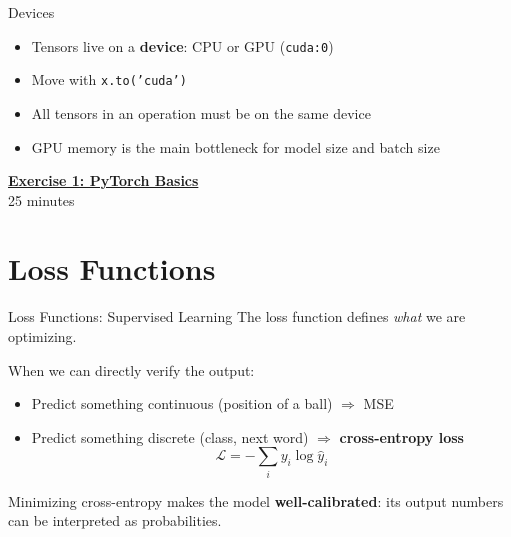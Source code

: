 \documentclass[aspectratio=169]{beamer}
\begin{document}
\begin{frame}[fragile]{Devices}
\begin{itemize}
\item Tensors live on a \textbf{device}: CPU or GPU (\texttt{cuda:0})
\item Move with \texttt{x.to('cuda')}
\item All tensors in an operation must be on the same device
\item GPU memory is the main bottleneck for model size and batch size
\end{itemize}
\end{frame}

\begin{frame}{}
\centering
\Large \href{https://colab.research.google.com/github/wusche1/Illiad_ML_Engineering/blob/main/lectures/01_a_ml_foundations/exercises/01_pytorch_basics/notebook.ipynb}{\textbf{Exercise 1: PyTorch Basics}} \\[1em]
\normalsize 25 minutes \\[1em]
\end{frame}

\section{Loss Functions}

\begin{frame}{Loss Functions: Supervised Learning}
The loss function defines \emph{what} we are optimizing.
\vspace{0.5em}

When we can directly verify the output:
\begin{itemize}
\item Predict something continuous (position of a ball) $\Rightarrow$ MSE
\item Predict something discrete (class, next word) $\Rightarrow$ \textbf{cross-entropy loss}
$$\mathcal{L} = -\sum_i y_i \log \hat{y}_i$$
\end{itemize}
\vspace{0.5em}
Minimizing cross-entropy makes the model \textbf{well-calibrated}: its output numbers can be interpreted as probabilities.
\end{frame}
\end{document}
